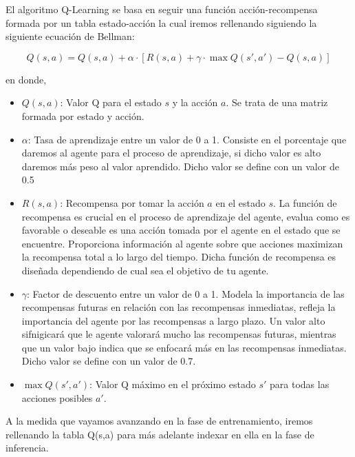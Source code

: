   El algoritmo Q-Learning se basa en seguir una función acción-recompensa formada por un tabla estado-acción la cual iremos rellenando siguiendo la siguiente ecuación
  de Bellman\cite{Bellman}:
  
  \begin{equation}
    Q(s, a) = Q(s, a) + \alpha \cdot [R(s, a) + \gamma \cdot \max Q(s', a') - Q(s, a)]
  \end{equation}

  en donde, 

  \begin{itemize}
    \item \textbf{$Q(s, a)$}: Valor Q para el estado $s$ y la acción $a$. Se trata de una matriz formada por estado y acción.
    \item \textbf{$\alpha$}: Tasa de aprendizaje entre un valor de 0 a 1. Consiste en el porcentaje que daremos al agente para el proceso de aprendizaje, 
    si dicho valor es alto daremos más peso al valor aprendido. Dicho valor se define con un valor de 0.5 
    \item \textbf{$R(s, a)$}: Recompensa por tomar la acción $a$ en el estado $s$. La función de recompensa es crucial en el proceso de aprendizaje del agente, evalua como es favorable o deseable
    es una acción tomada por el agente en el estado que se encuentre. Proporciona información al agente sobre que acciones maximizan la recompensa total a lo largo del tiempo. Dicha función
    de recompensa es diseñada dependiendo de cual sea el objetivo de tu agente. 
    \item \textbf{$\gamma$}: Factor de descuento entre un valor de 0 a 1. Modela la importancia de las recompensas futuras en relación con las recompensas inmediatas, refleja la importancia del agente
    por las recompensas a largo plazo. Un valor alto sifnigicará que le agente valorará mucho las recompensas futuras, mientras que un valor bajo indica que se enfocará más en las recompensas
    inmediatas. Dicho valor se define con un valor de 0.7.
    \item \textbf{$\max Q(s', a')$}: Valor Q máximo en el próximo estado $s'$ para todas las acciones posibles $a'$.
\end{itemize}

A la medida que vayamos avanzando en la fase de entrenamiento, iremos rellenando la tabla Q(s,a) para más adelante indexar en ella en la fase de inferencia.

